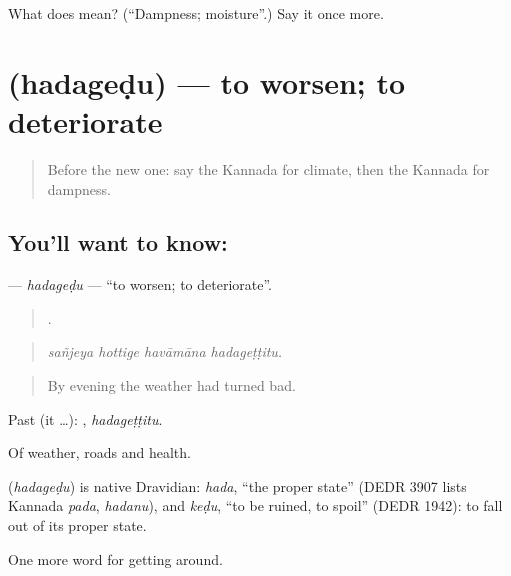 \begin{tcolorbox}[breakable,colback=teal!4,colframe=teal!35!black,title={Before you move on}]
What does  mean? (\textquotedblleft{}Dampness; moisture\textquotedblright{}.) Say it once more.
\end{tcolorbox}
\section[\texorpdfstring{\kn{ಹದಗೆಡು} (hadageḍu)}{ಹದಗೆಡು (hadageḍu)}]{ (hadageḍu) — to worsen; to deteriorate}

\label{lesson:KA-C484-hadagedu}



\begin{quote}
Before the new one: say the Kannada for climate, then the Kannada for dampness.
\end{quote}

\subsection*{You'll want to know: }
\textbf{} — \emph{hadageḍu} — \textquotedblleft{}to worsen; to deteriorate\textquotedblright{}.

\begin{quote}
   .
\end{quote}

\begin{quote}
\emph{sañjeya hottige havāmāna hadageṭṭitu.}
\end{quote}

\begin{quote}
By evening the weather had turned bad.
\end{quote}

Past (it …): , \emph{hadageṭṭitu}.

Of weather, roads and health.

\begin{cousinweb}
\textbf{} (\emph{hadageḍu}) is native Dravidian: \emph{hada}, \textquotedblleft{}the proper state\textquotedblright{} (DEDR 3907 lists Kannada \emph{pada}, \emph{hadanu}), and \emph{keḍu}, \textquotedblleft{}to be ruined, to spoil\textquotedblright{} (DEDR 1942): to fall out of its proper state.
\end{cousinweb}

\begin{grammarlens}[title={What you've built}]
One more word for getting around.
\end{grammarlens}

